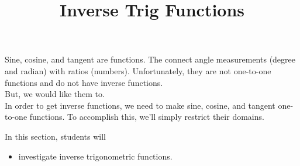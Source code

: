 \documentclass{ximera}
\title{Inverse Trig Functions}
\begin{document}
\begin{abstract}
%
\end{abstract}
\maketitle





Sine, cosine, and tangent are functions. The connect angle measurements (degree and radian) with ratios (numbers). Unfortunately, they are not one-to-one functions and do not have inverse functions. \\

But, we would like them to.\\

In order to get inverse functions, we need to make sine, cosine, and tangent one-to-one functions.  To accomplish this, we'll simply restrict their domains.
















\begin{sectionOutcomes}
In this section, students will 

\begin{itemize}
\item investigate inverse trigonometric functions.
\end{itemize}
\end{sectionOutcomes}
\end{document}
